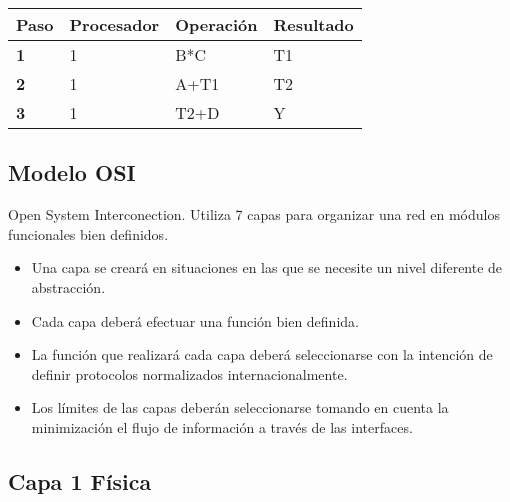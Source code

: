 {\raggedright

\vspace{3pt} \noindent
\begin{tabular}{|p{96pt}p{96pt}p{96pt}p{96pt}|}
\hline
\parbox{96pt}{\raggedright 
\textbf{Paso}
} & \parbox{96pt}{\raggedright 
\textbf{Procesador}
} & \parbox{96pt}{\raggedright 
\textbf{Operación}
} & \parbox{96pt}{\raggedright 
\textbf{Resultado}
} \\
\hline
\parbox{96pt}{\raggedright 
\textbf{1}
} & \parbox{96pt}{\raggedright 
1
} & \parbox{96pt}{\raggedright 
B*C
} & \parbox{96pt}{\raggedright 
T1
} \\
\hline
\parbox{96pt}{\raggedright 
\textbf{2}
} & \parbox{96pt}{\raggedright 
1
} & \parbox{96pt}{\raggedright 
A+T1
} & \parbox{96pt}{\raggedright 
T2
} \\
\hline
\parbox{96pt}{\raggedright 
\textbf{3}
} & \parbox{96pt}{\raggedright 
1
} & \parbox{96pt}{\raggedright 
T2+D
} & \parbox{96pt}{\raggedright 
Y
} \\
\hline
\end{tabular}
\vspace{2pt}

}

\begin{center}
\section{Modelo OSI}
\end{center}

Open System Interconection. Utiliza 7 capas para organizar una red en módulos funcionales bien definidos.
\hfill \break

\begin{itemize}
\item Una capa se creará en situaciones en las que se necesite un nivel diferente de abstracción.

\item Cada capa deberá efectuar una función bien definida.

\item La función que realizará cada capa deberá seleccionarse con la intención de definir protocolos normalizados internacionalmente.

\item Los límites de las capas deberán seleccionarse tomando en cuenta la minimización el flujo de información a través de las interfaces.
\end{itemize}

{\raggedright
\subsection{Capa 1 \textbf{Física}}
}


